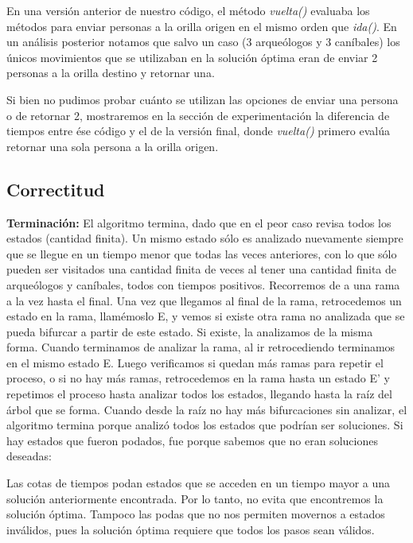 En una versión anterior de nuestro código, el método \textit{vuelta()} evaluaba los métodos para enviar personas a la orilla origen en el mismo orden que \textit{ida()}.
En un análisis posterior notamos que salvo un caso (3 arqueólogos y 3 caníbales) los únicos movimientos que se utilizaban en la solución óptima eran de enviar 2 personas a la orilla destino y retornar una.

Si bien no pudimos probar cuánto se utilizan las opciones de enviar una persona o de retornar 2, mostraremos en la sección de experimentación la diferencia de tiempos entre ése código y el de la versión final, donde \textit{vuelta()} primero evalúa retornar una sola persona a la orilla origen.

\subsection{Correctitud}

\textbf{Terminación:} El algoritmo termina, dado que en el peor caso revisa todos los estados (cantidad finita). Un mismo estado sólo es analizado nuevamente siempre que se llegue en un tiempo menor que todas las veces anteriores, con lo que sólo pueden ser visitados una cantidad finita de veces al tener una cantidad finita de arque\'ologos y can\'ibales, todos con tiempos positivos.
Recorremos de a una rama a la vez hasta el final. Una vez que llegamos al final de la rama, retrocedemos un estado en la rama, llamémoslo E, y vemos si existe otra rama no analizada que se pueda bifurcar a partir de este estado. Si existe, la analizamos de la misma forma. Cuando terminamos de analizar la rama, al ir retrocediendo terminamos en el mismo estado E. Luego verificamos si quedan más ramas para repetir el proceso, o si no hay más ramas, retrocedemos en la rama hasta un estado E' y repetimos el proceso hasta analizar todos los estados, llegando hasta la raíz del árbol que se forma. Cuando desde la raíz no hay más bifurcaciones sin analizar, el algoritmo termina porque analizó todos los estados que podrían ser soluciones. Si hay estados que fueron podados, fue porque sabemos que no eran soluciones deseadas:

Las cotas de tiempos podan estados que se acceden en un tiempo mayor a una solución anteriormente encontrada.
Por lo tanto, no evita que encontremos la solución óptima.
Tampoco las podas que no nos permiten movernos a estados inválidos, pues la solución óptima requiere que todos los pasos sean válidos.
 \\

